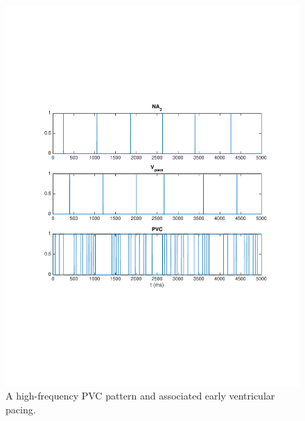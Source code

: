 \begin{figure}[tb]
	\centering
	\includegraphics[width=0.7\linewidth]{figures/bug6_kept1.pdf}
	\caption{A high-frequency PVC pattern and associated early ventricular pacing.}
	\label{fig:bug6_kept1}
\end{figure}

